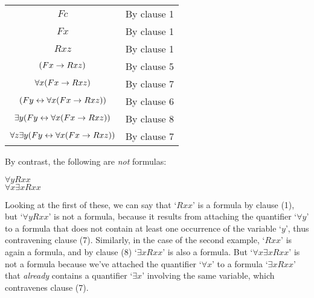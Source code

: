 \begin{center}
\begin{tabular}{ c c }
$Fc$ 	& By clause 1 \\
$Fx$		& By clause 1\\
$Rxz$ 	& By clause 1\\
$(Fx \rightarrow Rxz)$	& By clause 5\\
$\forall x (Fx \rightarrow Rxz)$ 	& By clause 7\\
$(Fy \leftrightarrow \forall x (Fx \rightarrow Rxz))$ 	& By clause 6 \\
$\exists y (Fy \leftrightarrow \forall x (Fx \rightarrow Rxz))$	& By clause 8\\
$\forall z\exists y (Fy \leftrightarrow \forall x (Fx \rightarrow Rxz))$	& By clause 7\\
\end{tabular}
\end{center}



By contrast, the following are \emph{not} formulas:
	\begin{center}
		$\forall y Rxx$\\
		$\forall x \exists x Rxx$\\

	\end{center}
Looking at the first of these, we can say that `$Rxx$' is a formula by clause (1), but `$\forall y Rxx$' is not a formula, because it results from attaching the quantifier `$\forall y$' to a formula that does not contain at least one occurrence of the variable `$y$', thus contravening clause (7).  Similarly, in the case of the second example, `$Rxx$' is again a formula, and by clause (8) `$\exists x Rxx$' is also a formula.  But `$\forall x\exists xRxx$' is not a formula because we've attached the quantifier `$\forall x$' to a formula `$\exists xRxx$' that \emph{already} contains a quantifier `$\exists x$' involving the same variable, which contravenes clause (7).

